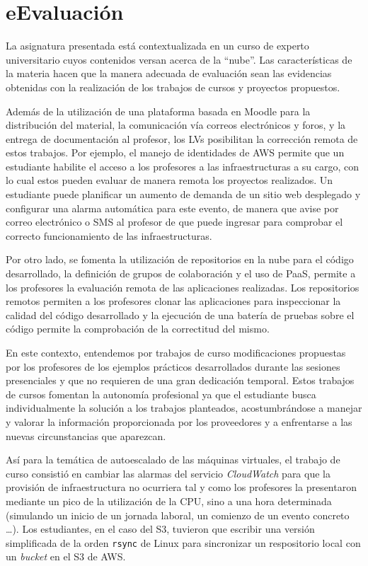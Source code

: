\documentclass[conference]{IEEEtran}
\begin{document}
\section{eEvaluación
\label{sec:eValuacion}}

La asignatura presentada está contextualizada en un curso de experto universitario cuyos contenidos versan acerca de la ``nube''.
Las características de la materia hacen que la manera adecuada de evaluación sean las evidencias obtenidas con la realización de los trabajos de cursos y proyectos propuestos.

Además de la utilización de una plataforma basada en Moodle para la distribución del material, la comunicación vía correos electrónicos y foros, y la entrega de documentación al profesor,
los LVs posibilitan la corrección remota de estos trabajos. Por ejemplo, el manejo de identidades de AWS permite que un estudiante habilite el acceso a los profesores a las infraestructuras a su cargo,
con lo cual estos pueden evaluar de manera remota los proyectos realizados.
Un estudiante puede planificar un aumento de demanda de un sitio web desplegado y configurar una alarma automática para este evento,
de manera que avise por correo electrónico o SMS al profesor de que puede ingresar para 
comprobar el correcto funcionamiento de las infraestructuras.


Por otro lado, se fomenta la utilización de repositorios en la nube para el código desarrollado, la definición de grupos de colaboración y el uso de PaaS, permite a los profesores la evaluación remota de las aplicaciones realizadas.
Los repositorios remotos permiten a los profesores clonar las aplicaciones para inspeccionar la calidad del código desarrollado y
la ejecución de una batería de pruebas sobre el código permite la comprobación de la correctitud del mismo. 

En este contexto, entendemos por trabajos de curso modificaciones propuestas por los profesores de los ejemplos prácticos desarrollados durante las sesiones presenciales y que no requieren
de una gran dedicación temporal.
Estos trabajos de cursos fomentan la autonomía profesional ya que
el estudiante  busca individualmente la solución a los trabajos planteados, acostumbrándose a manejar y valorar la información proporcionada por
los proveedores y a enfrentarse a las nuevas circunstancias que aparezcan.

Así para la temática de autoescalado de las máquinas virtuales, el trabajo de curso consistió en cambiar las alarmas del servicio \textit{CloudWatch} para que la provisión de infraestructura
no ocurriera tal y como los profesores la presentaron mediante un pico de la utilización de la CPU,
sino a una hora determinada (simulando un inicio de un jornada laboral, un comienzo de un evento concreto \dots). Los estudiantes, en el caso del S3, tuvieron que escribir una versión simplificada
de la orden \texttt{rsync} de Linux para sincronizar un respositorio local con un \textit{bucket} en el S3 de AWS.
 
\end{document}
